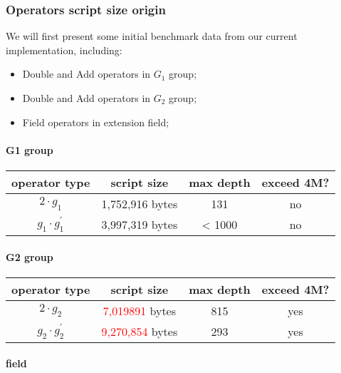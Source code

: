 \subsubsection{Operators script size origin}

We will first present some initial benchmark data from our current implementation, including:

\begin{itemize}
    \item Double and Add operators in $G_1$ group;
    \item Double and Add operators in $G_2$ group;
    \item Field operators in extension field;
\end{itemize}

\paragraph*{G1 group}

\begin{center}
\begin{tabular}{|c|c|c|c|} \hline
operator type & script size & max depth & exceed 4M? \\ \hline
$2 \cdot g_1$ & 1,752,916 bytes & 131 & no  \\ \hline
$g_1 \cdot g_1^{'}$ & 3,997,319 bytes &	< 1000 & no \\ \hline
\end{tabular}
\end{center}

\paragraph*{G2 group}

\begin{center}
\begin{tabular}{|c|c|c|c|} \hline
operator type & script size & max depth & exceed 4M? \\ \hline
$2 \cdot g_2$ & \textcolor{red}{7,019891} bytes & 815 & yes  \\ \hline
$g_2 \cdot g_2^{'}$ & \textcolor{red}{9,270,854} bytes &	293 & yes \\ \hline
\end{tabular}
\end{center}

\paragraph*{field}

